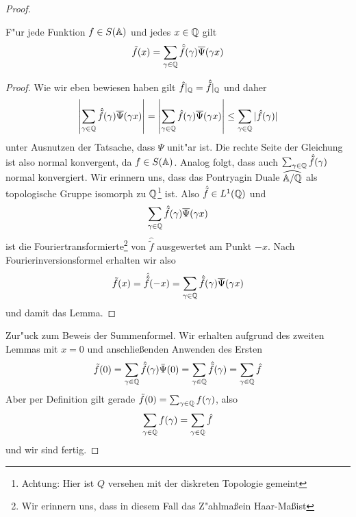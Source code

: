 \begin{proof}
		\begin{lemma}
			F"ur jede Funktion $f \in S(\mathbb{A})$ und jedes $x\in \mathbb{Q}$ gilt
			\begin{align*}
				\tilde{f}(x) = \sum_{\gamma \in \mathbb{Q}} {\hat{\tilde{f}}(\gamma)\overline{\Psi}(\gamma x)}
			\end{align*}
		\end{lemma}
		\begin{proof}
			Wie wir eben bewiesen haben gilt $\hat{f}|_{\mathbb{Q}} = \hat{\tilde{f}}|_{\mathbb{Q}}$ und daher
			\begin{align*}
				\left| \sum_{\gamma \in \mathbb{Q}} {\hat{\tilde{f}}(\gamma)\overline{\Psi}(\gamma x)}\right| = 
				\left| \sum_{\gamma \in \mathbb{Q}} {\hat{f}(\gamma)\overline{\Psi}(\gamma x)}\right| 
				\leq \sum_{\gamma \in \mathbb{Q}} {|\hat{f}(\gamma)|}
			\end{align*}
			unter Ausnutzen der Tatsache, dass $\Psi$ unit"ar ist. Die rechte Seite der Gleichung ist also normal konvergent, da $f \in S(\mathbb{A})$. Analog folgt, dass auch $\sum_{\gamma \in \mathbb{Q}} {\hat{\tilde{f}}(\gamma)}$ normal konvergiert. Wir erinnern uns, dass das Pontryagin Duale $\widehat{\mathbb{A}/\mathbb{Q}}$ als topologische Gruppe isomorph zu $\mathbb{Q}$\footnote{Achtung: Hier ist $Q$ versehen mit der diskreten Topologie gemeint} ist. Also $\hat{\tilde{f}} \in L^1(\mathbb{Q})$ und
			\begin{align*}
				\sum_{\gamma \in \mathbb{Q}} {\hat{\tilde{f}}(\gamma)\overline{\Psi}(\gamma x)}
			\end{align*}
			ist die Fouriertransformierte\footnote{Wir erinnern uns, dass in diesem Fall das Z"ahlma\ss ein Haar-Ma\ss ist} von $\hat{\tilde{f}}$ ausgewertet am Punkt $-x$. Nach Fourierinversionsformel erhalten wir also
			\begin{align*}
				\tilde{f}(x) = \hat{\hat{\tilde{f}}}(-x) = \sum_{\gamma \in \mathbb{Q}} {\hat{\tilde{f}}(\gamma)\overline{\Psi}(\gamma x)}
			\end{align*}
			und damit das Lemma.
		\end{proof}
		Zur"uck zum Beweis der Summenformel. Wir erhalten aufgrund des zweiten Lemmas mit $x=0$ und anschlie\ss enden Anwenden des Ersten
		\begin{align*}
			\tilde{f}(0) = 	\sum_{\gamma \in \mathbb{Q}} \hat{\tilde{f}}(\gamma) \bar{\Psi}(0) =
							\sum_{\gamma \in \mathbb{Q}} \hat{\tilde{f}}(\gamma) =
							\sum_{\gamma \in \mathbb{Q}} \hat{f}
		\end{align*}
		Aber per Definition gilt gerade $\tilde{f}(0) = \sum_{\gamma \in \mathbb{Q}}f(\gamma)$, also
		\begin{align*}
			\sum_{\gamma \in \mathbb{Q}}f(\gamma) = \sum_{\gamma \in \mathbb{Q}} \hat{f}
		\end{align*}
		und wir sind fertig.
	\end{proof}
	
